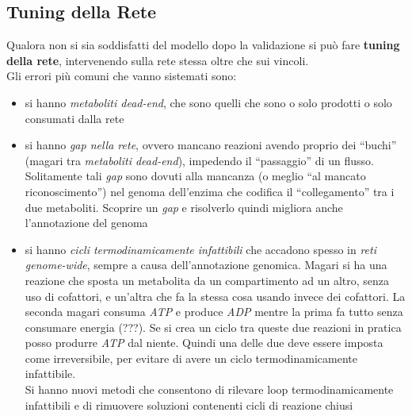 \documentclass[a4paper,12pt, oneside]{book}
\begin{document}
\subsection{Tuning della Rete}
Qualora non si sia soddisfatti del modello dopo la validazione si può fare
\textbf{tuning della rete}, intervenendo sulla rete stessa oltre che sui
vincoli. \\
Gli errori più comuni che vanno sistemati sono:
\begin{itemize}
  \item si hanno \textit{metaboliti dead-end}, che sono quelli che sono o solo
  prodotti o solo consumati dalla rete
  \item si hanno \textit{gap nella rete}, ovvero mancano reazioni avendo proprio
  dei ``buchi'' (magari tra \textit{metaboliti dead-end}), impedendo il
  ``passaggio'' di un flusso. Solitamente tali \textit{gap} sono dovuti alla
  mancanza (o meglio ``al mancato riconoscimento'') nel genoma dell'enzima che
  codifica il ``collegamento'' tra i due metaboliti. Scoprire un \textit{gap} e
  risolverlo quindi migliora anche l'annotazione del genoma
  \item si hanno \textit{cicli termodinamicamente infattibili} che accadono
  spesso in \textit{reti genome-wide}, sempre a causa dell'annotazione
  genomica. Magari si ha una reazione che sposta un metabolita da un
  compartimento ad un altro, senza uso di cofattori, e un'altra che fa la stessa
  cosa usando invece dei cofattori. La seconda magari consuma \textit{ATP} e
  produce \textit{ADP} mentre la prima fa tutto senza consumare energia
  (???). Se si 
  crea un ciclo tra queste due reazioni in pratica posso produrre \textit{ATP}
  dal niente. Quindi una delle due deve essere imposta come irreversibile, per
  evitare di avere un ciclo termodinamicamente infattibile.\\
  Si hanno nuovi metodi che consentono di rilevare loop termodinamicamente
  infattibili e di rimuovere soluzioni contenenti cicli di reazione chiusi
\end{itemize}
\end{document}
